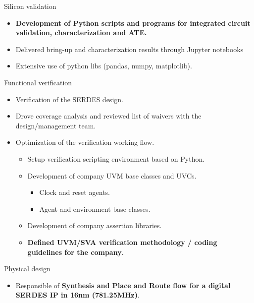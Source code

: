 \begin{cventries}
{\begin{cvitems}
\begin{itemize}
\begin{itemize}
          \end{itemize}
        \end{itemize}
        \item {Silicon validation}
          \begin{itemize}
            \item {\textbf{Development of Python scripts and programs for integrated circuit validation, characterization and ATE.}}
            \item {Delivered bring-up and characterization results through Jupyter notebooks}
            \item {Extensive use of python libs (pandas, numpy, matplotlib).}
          \end{itemize}
        \item {Functional verification}
        \begin{itemize}
          \item {Verification of the SERDES design.}
          \item {Drove coverage analysis and reviewed list of waivers with the design/management team.}
          \item {Optimization of the verification working flow.}
          \begin{itemize}
            \item {Setup verification scripting environment based on Python.}
            \item {Development of company UVM base classes and UVCs.}
              \begin{itemize}
                \item {Clock and reset agents.}
                \item {Agent and environment base classes.}
              \end{itemize}
            \item {Development of company assertion libraries.}
            \item {\textbf{Defined UVM/SVA verification methodology / coding guidelines for the company}.}
          \end{itemize}
        \end{itemize}
        \item {Physical design}
        \begin{itemize}
          \item {Responsible of \textbf{Synthesis and Place and Route flow for a digital SERDES IP in 16nm (781.25MHz)}.}

\end{itemize}
\end{cvitems}}
\end{cventries}
